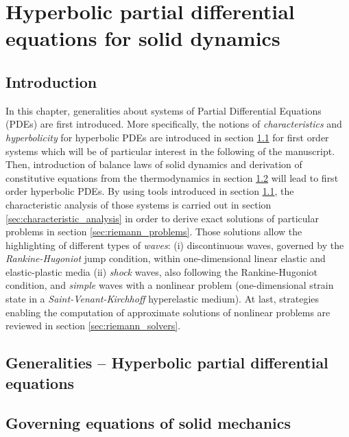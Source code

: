\chapter{Hyperbolic partial differential equations for solid dynamics}

\section*{Introduction}
In this chapter, generalities about systems of Partial Differential Equations (PDEs) are first introduced. More specifically, the notions of \textit{characteristics} and \textit{hyperbolicity} for hyperbolic PDEs are introduced in section \ref{sec:PDEs} for first order systems which will be of particular interest in the following of the manuscript.
Then, introduction of balance laws of solid dynamics and derivation of constitutive equations from the thermodynamics in section \ref{sec:solidMech_equations} will lead to first order hyperbolic PDEs.
By using tools introduced in section \ref{sec:PDEs}, the characteristic analysis of those systems is carried out in section \ref{sec:characteristic_analysis} in order to derive exact solutions of particular problems in section \ref{sec:riemann_problems}. Those solutions allow the highlighting of different types of \textit{waves}: (i) discontinuous waves, governed by the \textit{Rankine-Hugoniot} jump condition, within one-dimensional linear elastic and elastic-plastic media (ii) \textit{shock} waves, also following the Rankine-Hugoniot condition, and \textit{simple} waves with a nonlinear problem (one-dimensional strain state in a \textit{Saint-Venant-Kirchhoff} hyperelastic medium).
At last, strategies enabling the computation of approximate solutions of nonlinear problems are reviewed in section \ref{sec:riemann_solvers}.


\section{Generalities -- Hyperbolic partial differential equations}
\label{sec:PDEs}


\section{Governing equations of solid mechanics}
\label{sec:solidMech_equations}



